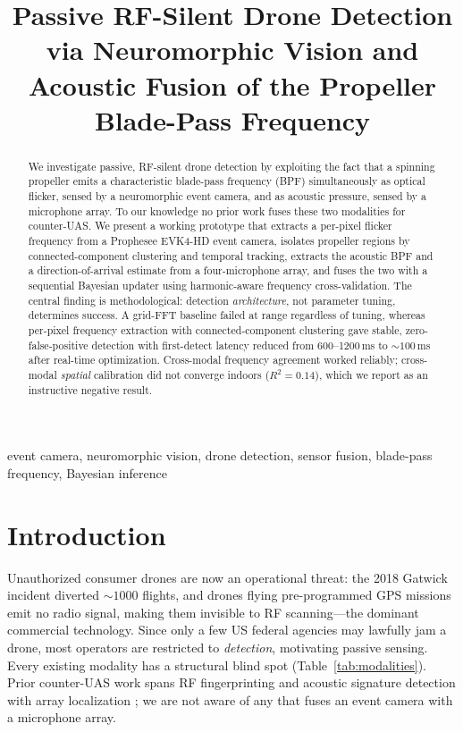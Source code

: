 \documentclass[conference]{IEEEtran}
\begin{document}
\title{Passive RF-Silent Drone Detection via Neuromorphic Vision and
Acoustic Fusion of the Propeller Blade-Pass Frequency}

\author{
\and
{}
}

\maketitle

\begin{abstract}
We investigate passive, RF-silent drone detection by exploiting the fact
that a spinning propeller emits a characteristic blade-pass frequency
(BPF) simultaneously as optical flicker, sensed by a neuromorphic event
camera, and as acoustic pressure, sensed by a microphone array. To our
knowledge no prior work fuses these two modalities for counter-UAS. We
present a working prototype that extracts a per-pixel flicker frequency
from a Prophesee EVK4-HD event camera, isolates propeller regions by
connected-component clustering and temporal tracking, extracts the
acoustic BPF and a direction-of-arrival estimate from a four-microphone
array, and fuses the two with a sequential Bayesian updater using
harmonic-aware frequency cross-validation. The central finding is
methodological: detection \emph{architecture}, not parameter tuning,
determines success. A grid-FFT baseline failed at range regardless of
tuning, whereas per-pixel frequency extraction with connected-component
clustering gave stable, zero-false-positive detection with first-detect
latency reduced from 600--1200\,ms to ${\sim}100$\,ms after real-time
optimization. Cross-modal frequency agreement worked reliably; cross-modal
\emph{spatial} calibration did not converge indoors ($R^2 = 0.14$), which
we report as an instructive negative result.
\end{abstract}

\begin{IEEEkeywords}
event camera, neuromorphic vision, drone detection, sensor fusion,
blade-pass frequency, Bayesian inference
\end{IEEEkeywords}

\section{Introduction}
Unauthorized consumer drones are now an operational threat: the 2018
Gatwick incident diverted ${\sim}1000$ flights, and drones flying
pre-programmed GPS missions emit no radio signal, making them invisible to
RF scanning---the dominant commercial technology. Since only a few US
federal agencies may lawfully jam a drone, most operators are restricted to
\emph{detection}, motivating passive sensing. Every existing modality has a
structural blind spot (Table~\ref{tab:modalities}). Prior counter-UAS work
spans RF fingerprinting \cite{guvenc2018,ezuma2020} and acoustic signature
detection with array localization \cite{mezei2015,shi2018}; we are not
aware of any that fuses an event camera with a microphone array.
\end{document}
